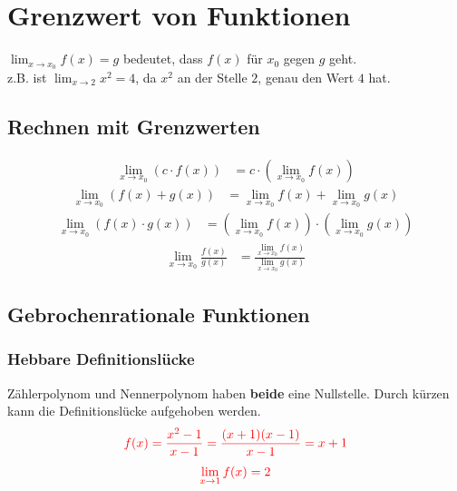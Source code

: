 \section{Grenzwert von Funktionen}
$\lim_{x \to x_0}f(x) = g$ bedeutet, dass $f(x)$ für $x_0$ gegen $g$ geht.\\
z.B. ist $\lim_{x \to 2} x^2 = 4$, da $x^2$ an der Stelle $2$, genau den Wert $4$ hat.\\
\subsection{Rechnen mit Grenzwerten}
\begin{align*}
    \lim_{x \to x_0}(c \cdot f(x)) & = c \cdot (\lim_{x \to x_0} f(x))
\end{align*}
\begin{align*}
    \lim_{x \to x_0}(f(x) + g(x)) & = \lim_{x \to x_0} f(x) + \lim_{x \to x_0} g(x)
\end{align*}
\begin{align*}
    \lim_{x \to x_0}(f(x) \cdot g(x)) & = (\lim_{x \to x_0} f(x)) \cdot (\lim_{x \to x_0} g(x))
\end{align*}
\begin{align*}
    \lim_{x \to x_0}\frac{f(x)}{g(x)} & = \frac{\lim_{x \to x_0} f(x)}{\lim_{x \to x_0} g(x)}
\end{align*}
\subsection{Gebrochenrationale Funktionen}
\subsubsection{Hebbare Definitionslücke}
Zählerpolynom und Nennerpolynom haben \textbf{beide} eine Nullstelle. Durch kürzen kann die Definitionslücke
aufgehoben werden.
\begin{align*}
    \textcolor{red}{f(x) = \frac{x^2-1}{x-1} = \frac{(x+1)(x-1)}{x-1} = x+1}
\end{align*}
\begin{align*}
    \textcolor{red}{\lim_{x \to 1} f(x) = 2}
\end{align*}
\begin{center}
\end{center}

